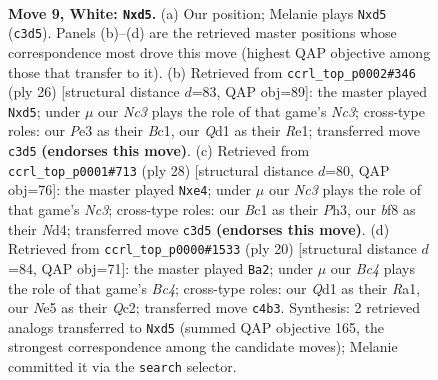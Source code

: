 \documentclass[11pt]{article}
\begin{document}
\clearpage

\begin{figure}[p]\centering
\begin{subfigure}{0.46\textwidth}\centering
\resizebox{\linewidth}{!}{%
\newchessgame
\chessboard[
  setfen={r1bqkb1r/pp3ppp/1np1p3/3nN3/2BP4/2N1P3/PP3PPP/R1BQK2R w KQkq - 3 9},
  showmover=false,
  pgfstyle=straightmove, color=movearrow, markmove={c3-d5}
]}
\caption{}
\end{subfigure}\hfill
\begin{subfigure}{0.46\textwidth}\centering
\resizebox{\linewidth}{!}{%
\newchessgame
\chessboard[
  setfen={r2q1rk1/pp1bnpp1/4pb1p/3nN3/3PB3/2NQ4/PP3PPP/R1B1R1K1 w - - 0 14},
  showmover=false,
  pgfstyle=straightmove, color=movearrow, markmove={c3-d5}
]}
\caption{}
\end{subfigure}
\\[4pt]
\begin{subfigure}{0.46\textwidth}\centering
\resizebox{\linewidth}{!}{%
\newchessgame
\chessboard[
  setfen={r1bqr1k1/1p2bpp1/p4n1p/3p4/P2NnB2/2N1P2P/1PB2PP1/R2Q1RK1 w - - 3 15},
  showmover=false,
  pgfstyle=straightmove, color=movearrow, markmove={c3-e4}
]}
\caption{}
\end{subfigure}\hfill
\begin{subfigure}{0.46\textwidth}\centering
\resizebox{\linewidth}{!}{%
\newchessgame
\chessboard[
  setfen={r1bqk2r/3nbppp/ppp1p3/3n4/2BP2P1/P1N1PN2/1PQB1P1P/R3K2R w KQkq - 0 11},
  showmover=false,
  pgfstyle=straightmove, color=movearrow, markmove={c4-a2}
]}
\caption{}
\end{subfigure}
\caption{\textbf{Move 9, White: \texttt{Nxd5}.} (a) Our position; Melanie plays \texttt{Nxd5} (\texttt{c3d5}). Panels (b)--(d) are the retrieved master positions whose correspondence most drove this move (highest QAP objective among those that transfer to it). (b) Retrieved from \texttt{ccrl\_top\_p0002\#346} (ply 26) [structural distance $d$=83, QAP obj=89]: the master played \texttt{Nxd5}; under $\mu$ our \emph{Nc3} plays the role of that game's \emph{Nc3}; cross-type roles: our \emph{P}e3 as their \emph{B}c1, our \emph{Q}d1 as their \emph{R}e1; transferred move \texttt{c3d5} \textbf{(endorses this move)}. (c) Retrieved from \texttt{ccrl\_top\_p0001\#713} (ply 28) [structural distance $d$=80, QAP obj=76]: the master played \texttt{Nxe4}; under $\mu$ our \emph{Nc3} plays the role of that game's \emph{Nc3}; cross-type roles: our \emph{B}c1 as their \emph{P}h3, our \emph{b}f8 as their \emph{N}d4; transferred move \texttt{c3d5} \textbf{(endorses this move)}. (d) Retrieved from \texttt{ccrl\_top\_p0000\#1533} (ply 20) [structural distance $d$=84, QAP obj=71]: the master played \texttt{Ba2}; under $\mu$ our \emph{Bc4} plays the role of that game's \emph{Bc4}; cross-type roles: our \emph{Q}d1 as their \emph{R}a1, our \emph{N}e5 as their \emph{Q}c2; transferred move \texttt{c4b3}. Synthesis: 2 retrieved analogs transferred to \texttt{Nxd5} (summed QAP objective 165, the strongest correspondence among the candidate moves); Melanie committed it via the \texttt{search} selector.}
\label{fig:thought-m16}
\end{figure}
\end{document}
